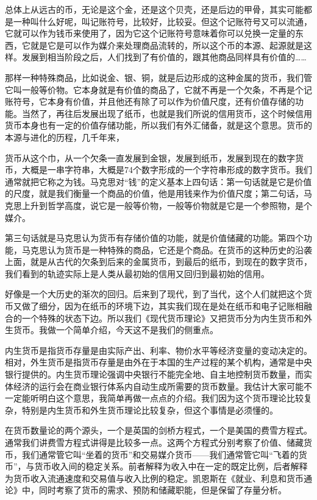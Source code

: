 \documentclass[UTF8, 12pt, a4paper]{ctexrep}
\begin{document}
总体上从远古的币，无论是这个金，还是这个贝壳，还是后边的甲骨，其实可能都是一种叫什么好呢，叫记账符号，比较好，比较妥。但这个记账符号又可以流通，它就可以作为钱币来使用了，因为它这个记账符号意味着你可以兑换一定量的东西，它就是它是可以作为媒介来处理商品流转的，所以这个币的本源、起源就是这样。发展到相当阶段之后，人们找到了有价值的，跟其他商品同样具有价值的……

那样一种特殊商品，比如说金、银、铜，就是后边形成的这种金属的货币，我们管它叫一般等价物。它本身就是有价值的商品了，它就不再是一个欠条，不再是个记账符号，它本身有价值，并且他还有除了可以作为价值尺度，还有价值存储的功能。当然了，再往后发展出现了纸币，也就是我们所说的信用货币，这个时候信用货币本身也有一定的价值存储功能，所以我们有外汇储备，就是这个意思。货币的本源与进化的历程，几千年来，

货币从这个巾，从一个欠条一直发展到金银，发展到纸币，发展到现在的数字货币，大概是一串字符串，大概是74个数字形成的一个字符串形成的数字货币。我们通常就把它称之为钱。马克思对“钱”的定义基本上四句话：第一句话就是它是价值的尺度，就是我们衡量一个商品的价值，他是用钱来作为价值尺度；第二句话，马克思上升到哲学高度，说它是一般等价物，一般等价物就是它是一个参照物，是个媒介。

第三句话就是马克思认为货币有存储价值的功能，就是价值储藏的功能。第四个功能，马克思认为货币是一种特殊的商品，它还是个商品。在货币的这种历史的沿袭上面，就是从古代的欠条到后来的金属货币，到最后的纸币，到现在的数字货币，我们看到的轨迹实际上是人类从最初始的信用又回归到最初始的信用。

好像是一个大历史的渐次的回归。后来到了现代，到了当代，这个人们就把这个货币又做了细分，因为在纸币的环境下边，其实我们现在是处在纸币和电子记账相融合的一个特殊的状态下边。所以我们《现代货币理论》又把货币分为内生货币和外生货币。我做一个简单介绍，今天这不是我们的侧重点。

内生货币是指货币存量是由实际产出、利率、物价水平等经济变量的变动决定的。相对，外生货币是指货币存量是由外在于本国的生产过程的某个机构，通常是中央银行提供的。内生货币理论强调中央银行不能完全地、自主地控制货币数量，而实体经济的运行会在商业银行体系内自动生成所需要的货币数量。我估计大家可能不一定能听明白这个意思，我简单再做一点点的介绍。我们因为这个货币理论比较复杂，特别是内生货币和外生货币理论比较复杂，但这个事情是必须懂的。

在货币数量论的两个源头，一个是英国的剑桥方程式，一个是美国的费雪方程式。通常我们讲费雪方程式讲得是比较多一点。这两个方程式分别考察了价值、储藏货币，我们通常管它叫“坐着的货币”和交易媒介货币——我们通常管它叫“飞着的货币”，与货币收入间的稳定关系。前者解释为收入中在一定的既定比例，后者解释为货币收入流通速度和交易值与收入比例的稳定。凯恩斯在《就业、利息和货币通论》中，同时考察了货币的需求、预防和储藏职能，但是保留了存量分析。
\end{document}

